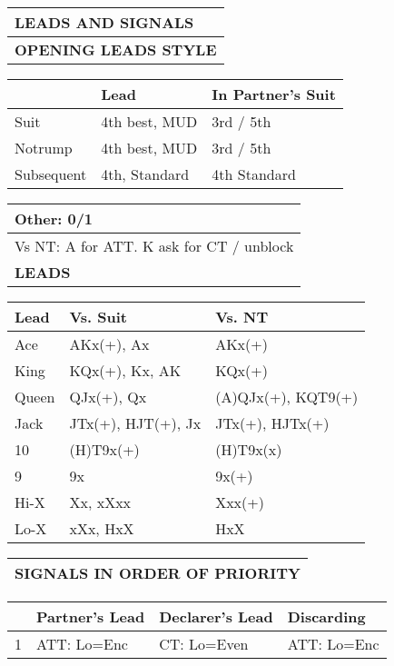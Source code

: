 \documentclass{article}
\begin{document}
\begin{minipage}{90mm}
	\begin{tabular}{| p{88mm} |}
		\hline
		\cellcolor[gray]{0.9} \textbf{LEADS AND SIGNALS} \\ \hline
		\cellcolor[gray]{0.9} \textbf{OPENING LEADS STYLE} \\ \hline
	\end{tabular}
	\begin{tabular}{| p{15.25mm} | p{32mm} | p{32mm} |}
		& Lead & In Partner's Suit \\ \hline
		Suit & 4th best, MUD & 3rd / 5th\\ \hline
		Notrump & 4th best, MUD & 3rd / 5th \\ \hline
		Subsequent & 4th, Standard & 4th Standard \\ \hline
	\end{tabular}
	\begin{tabular}{| p{88mm} |}
		Other: 0/1 \\ \hline
		Vs NT: A for ATT. K ask for CT / unblock \\ \hline
		\cellcolor[gray]{0.9} \textbf{LEADS} \\ \hline
	\end{tabular}
	\begin{tabular}{| p{15.25mm} | p{32mm} | p{32mm} |}
		Lead & Vs. Suit & Vs. NT \\ \hline
		Ace & AKx(+), Ax & AKx(+)\\ \hline
		King & KQx(+), Kx, AK & KQx(+) \\ \hline
		Queen & QJx(+), Qx & (A)QJx(+), KQT9(+) \\ \hline
		Jack & JTx(+), HJT(+), Jx & JTx(+), HJTx(+) \\ \hline
		10 & (H)T9x(+) & (H)T9x(x) \\ \hline
		9 & 9x & 9x(+) \\ \hline
		Hi-X & Xx, xXxx & Xxx(+) \\ \hline
		Lo-X & xXx, HxX & HxX \\ \hline
	\end{tabular}
	\begin{tabular}{| p{88mm} |}
		\cellcolor[gray]{0.9} \textbf{SIGNALS IN ORDER OF PRIORITY} \\ \hline
	\end{tabular}
	\begin{tabular}{| p{8.9mm} | p{22mm} | p{22mm} | p{22mm} |}
		& Partner's Lead & Declarer's Lead & Discarding \\ \hline
		1 & ATT: Lo=Enc & CT: Lo=Even & ATT: Lo=Enc \\ \hline

\end{tabular}
\end{minipage}
\end{document}

